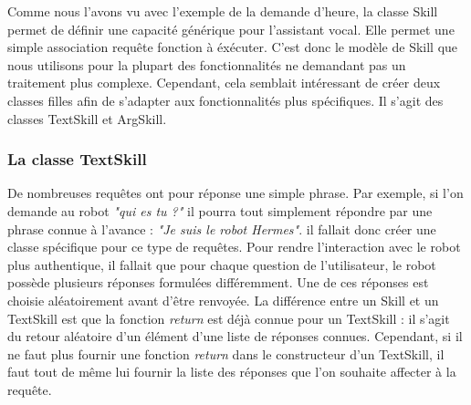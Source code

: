 \documentclass{report}
\begin{document}
        {Comme nous l'avons vu avec l'exemple de la demande d'heure, la classe Skill permet de
        définir une capacité générique pour l'assistant vocal. Elle permet une simple association
        requête \textrightarrow \space fonction à éxécuter. C'est donc le modèle de Skill que
         nous utilisons pour la plupart des fonctionnalités ne demandant pas un traitement plus
          complexe.}
        {Cependant, cela semblait intéressant de créer deux classes filles afin de s'adapter
        aux fonctionnalités plus spécifiques. Il s'agit des classes TextSkill et ArgSkill.}
      \subsubsection{La classe TextSkill}
        {De nombreuses requêtes ont pour réponse une simple phrase. Par exemple, si l'on demande
        au robot \textit{"qui es tu ?"} il pourra tout simplement répondre par une phrase connue
         à l'avance : \textit{"Je suis le robot Hermes"}. il fallait donc créer une classe
         spécifique pour ce type de requêtes.\newline}
        {Pour rendre l'interaction avec le robot plus authentique, il fallait
        que pour chaque question de l'utilisateur, le robot possède plusieurs réponses
        formulées différemment. Une de ces réponses est choisie aléatoirement avant d'être
         renvoyée.\newline}
        {La différence entre un Skill et un TextSkill est que la fonction \textit{return}
        est déjà connue pour un TextSkill : il s'agit du retour aléatoire d'un élément
        d'une liste de réponses connues. Cependant, si il ne faut plus fournir une
        fonction \textit{return} dans le constructeur d'un TextSkill, il faut tout de
        même lui fournir la liste des réponses que l'on souhaite affecter à la requête.}
\end{document}
